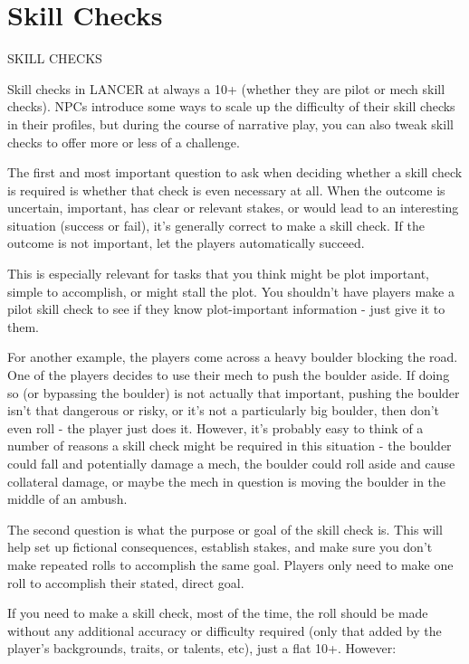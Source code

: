 \section{Skill Checks}

                                           SKILL CHECKS

Skill checks in LANCER at always a 10+ (whether they are pilot or mech skill checks). NPCs
introduce some ways to scale up the difficulty of their skill checks in their profiles, but during the
course of narrative play, you can also tweak skill checks to offer more or less of a challenge.


The first and most important question to ask when deciding whether a skill check is
required is whether that check is even necessary at all. When the outcome is uncertain,
important, has clear or relevant stakes, or would lead to an interesting situation (success or fail),
it’s generally correct to make a skill check. If the outcome is not important, let the players
automatically succeed.


This is especially relevant for tasks that you think might be plot important, simple to accomplish,
or might stall the plot. You shouldn’t have players make a pilot skill check to see if they know
plot-important information - just give it to them.


For another example, the players come across a heavy boulder blocking the road. One of the
players decides to use their mech to push the boulder aside. If doing so (or bypassing the
boulder) is not actually that important, pushing the boulder isn’t that dangerous or risky, or it’s
not a particularly big boulder, then don’t even roll - the player just does it. However, it’s probably
easy to think of a number of reasons a skill check might be required in this situation - the boulder
could fall and potentially damage a mech, the boulder could roll aside and cause collateral
damage, or maybe the mech in question is moving the boulder in the middle of an ambush.


The second question is what the purpose or goal of the skill check is. This will help set up
fictional consequences, establish stakes, and make sure you don’t make repeated rolls to
accomplish the same goal. Players only need to make one roll to accomplish their stated, direct
goal.


If you need to make a skill check, most of the time, the roll should be made without any
additional accuracy or difficulty required (only that added by the player’s backgrounds, traits, or
talents, etc), just a flat 10+. However:


